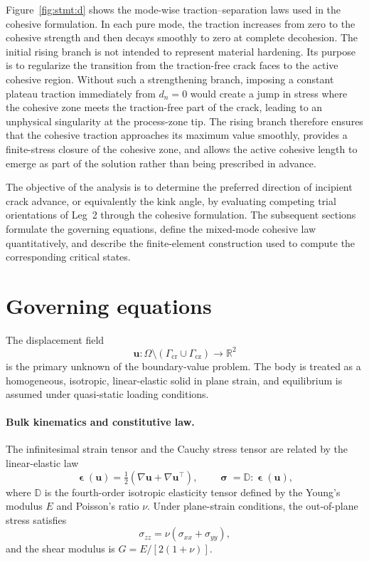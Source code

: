 \documentclass[smallextended]{svjour3}       %
\newcommand{\vb}[1]{\bm{#1}}      %
\newcommand{\four}[1]{\mathbb{#1}} %
\newcommand{\uu}{\vb{u}}
\newcommand{\eps}{\bm{\upvarepsilon}}
\newcommand{\sig}{\bm{\upsigma}}
\newcommand{\grad}{\nabla}
\begin{document}
Figure~\ref{fig:stmt:d} shows the mode-wise traction--separation laws used in
the cohesive formulation. In each pure mode, the traction increases from zero
to the cohesive strength and then decays smoothly to zero at complete
decohesion. The initial rising branch is not intended to represent material
hardening. Its purpose is to regularize the transition from the traction-free
crack faces to the active cohesive region. Without such a strengthening
branch, imposing a constant plateau traction immediately from $d_n=0$ would
create a jump in stress where the cohesive zone meets the traction-free part
of the crack, leading to an unphysical singularity at the process-zone tip.
The rising branch therefore ensures that the cohesive traction approaches its
maximum value smoothly, provides a finite-stress closure of the cohesive
zone, and allows the active cohesive length to emerge as part of the
solution rather than being prescribed in advance.



The objective of the analysis is to determine the preferred direction of
incipient crack advance, or equivalently the kink angle, by evaluating
competing trial orientations of Leg~2 through the cohesive formulation. The
subsequent sections formulate the governing equations, define the mixed-mode
cohesive law quantitatively, and describe the finite-element construction
used to compute the corresponding critical states.


\section{Governing equations}
\label{sec:governing}

The displacement field
\[
\uu:\Omega\setminus(\Gamma_{\mathrm{cr}}\cup\Gamma_{\mathrm{cz}})
\to\mathbb{R}^2
\]
is the primary unknown of the boundary-value problem. The body is treated as
a homogeneous, isotropic, linear-elastic solid in plane strain, and
equilibrium is assumed under quasi-static loading conditions.

\paragraph{Bulk kinematics and constitutive law.}
The infinitesimal strain tensor and the Cauchy stress tensor are related by
the linear-elastic law
\begin{equation}
	\eps(\uu)=\tfrac12(\grad\uu+\grad\uu^\top),
	\qquad
	\sig=\four D:\eps(\uu),
	\label{eq:constitutive}
\end{equation}
where \(\four D\) is the fourth-order isotropic elasticity tensor defined by
the Young's modulus \(E\) and Poisson's ratio \(\nu\). Under plane-strain
conditions, the out-of-plane stress satisfies
\[
\sigma_{zz}=\nu(\sigma_{xx}+\sigma_{yy}),
\]
and the shear modulus is \(G=E/[2(1+\nu)]\).
\end{document}
